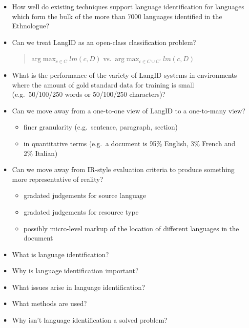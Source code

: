 \documentclass[a4paper,landscape,headrule,footrule,xetex]{foils}
\begin{document}
\begin{itemize}
\item How well do existing techniques support language identification
  for languages which form the bulk of the more than 7000 languages
  identified in the Ethnologue?
\item Can we treat LangID as an open-class classification problem?
  \begin{quote}
    $\mathrm{arg} \max_{c\in C} lm(c,D)$ vs.\ $\mathrm{arg} \max_{c\in
      C\cup C'} lm(c,D)$
  \end{quote}
\item What is the performance of the variety of LangID systems in
  environments where the amount of gold standard data for training is
  small (e.g.\ 50/100/250 words or 50/100/250 characters)?
\item Can we move away from a one-to-one view of LangID to a
  one-to-many view?
  \begin{itemize}
  \item finer granularity (e.g.\ sentence, paragraph, section)
  \item in quantitative terms (e.g.\ a document is 95\% English, 3\%
    French and 2\% Italian)
  \end{itemize}
\item Can we move away from IR-style evaluation criteria to produce
  something more representative of reality?
  \begin{itemize}
  \item gradated judgements for source language
  \item gradated judgements for resource type
  \item possibly micro-level markup of the location of different
    languages in the document
  \end{itemize}
\end{itemize}









\MyLogo

\begin{itemize}
\item What is language identification?
\item Why is language identification important?
\item What issues arise in language identification?
\item What methods are used?
\item Why isn't language identification a solved problem?
\end{itemize}
\end{document}
